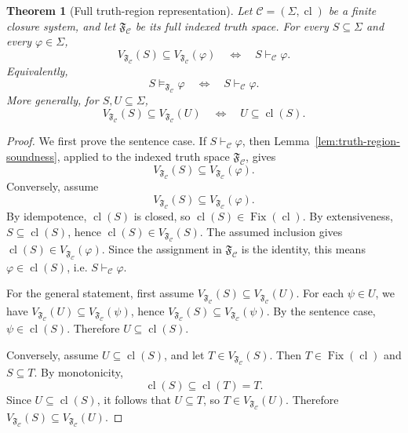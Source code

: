 \documentclass[10pt,a4paper]{amsart}
\numberwithin{equation}{section}
\newtheorem{theorem}{Theorem}[section]
\newcommand{\Cl}{\operatorname{cl}}
\newcommand{\Fix}{\operatorname{Fix}}
\newcommand{\C}{\mathcal C}
\newcommand{\F}{\mathfrak F}
\newcommand{\Sig}{\Sigma}
\begin{document}
\begin{theorem}[Full truth-region representation]
\label{thm:full-truth-region-representation}
Let \(\C=(\Sig,\Cl)\) be a finite closure system, and let \(\F_{\C}\) be its full indexed truth space. For every \(S\subseteq\Sig\) and every \(\varphi\in\Sig\),
\[
  V_{\F_{\C}}(S)\subseteq V_{\F_{\C}}(\varphi)
  \quad\Longleftrightarrow\quad
  S\vdash_{\C}\varphi.
\]
Equivalently,
\[
  S\models_{\F_{\C}}\varphi
  \quad\Longleftrightarrow\quad
  S\vdash_{\C}\varphi.
\]
More generally, for \(S,U\subseteq\Sig\),
\[
  V_{\F_{\C}}(S)\subseteq V_{\F_{\C}}(U)
  \quad\Longleftrightarrow\quad
  U\subseteq\Cl(S).
\]
\end{theorem}

\begin{proof}
We first prove the sentence case. If \(S\vdash_{\C}\varphi\), then Lemma~\ref{lem:truth-region-soundness}, applied to the indexed truth space \(\F_{\C}\), gives
\[
  V_{\F_{\C}}(S)\subseteq V_{\F_{\C}}(\varphi).
\]
Conversely, assume
\[
  V_{\F_{\C}}(S)\subseteq V_{\F_{\C}}(\varphi).
\]
By idempotence, \(\Cl(S)\) is closed, so \(\Cl(S)\in\Fix(\Cl)\). By extensiveness, \(S\subseteq\Cl(S)\), hence \(\Cl(S)\in V_{\F_{\C}}(S)\). The assumed inclusion gives \(\Cl(S)\in V_{\F_{\C}}(\varphi)\). Since the assignment in \(\F_{\C}\) is the identity, this means \(\varphi\in\Cl(S)\), i.e. \(S\vdash_{\C}\varphi\).

For the general statement, first assume \(V_{\F_{\C}}(S)\subseteq V_{\F_{\C}}(U)\). For each \(\psi\in U\), we have \(V_{\F_{\C}}(U)\subseteq V_{\F_{\C}}(\psi)\), hence \(V_{\F_{\C}}(S)\subseteq V_{\F_{\C}}(\psi)\). By the sentence case, \(\psi\in\Cl(S)\). Therefore \(U\subseteq\Cl(S)\).

Conversely, assume \(U\subseteq\Cl(S)\), and let \(T\in V_{\F_{\C}}(S)\). Then \(T\in\Fix(\Cl)\) and \(S\subseteq T\). By monotonicity,
\[
  \Cl(S)\subseteq\Cl(T)=T.
\]
Since \(U\subseteq\Cl(S)\), it follows that \(U\subseteq T\), so \(T\in V_{\F_{\C}}(U)\). Therefore \(V_{\F_{\C}}(S)\subseteq V_{\F_{\C}}(U)\).
\end{proof}
\end{document}
